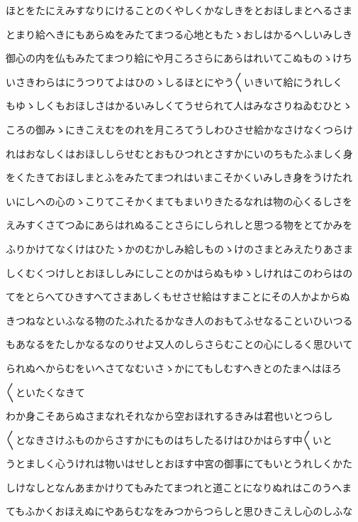 \documentclass[a4paper,11pt,landscape]{ltjtarticle}
\begin{document}
\par\medskip
ほとをたにえみすなりにけることのくやしくかなしきをとおほしまとへるさま
\par\medskip
とまり給へきにもあらぬをみたてまつる心地ともたゝおしはかるへしいみしき
\par\medskip
御心の内を仏もみたてまつり給にや月ころさらにあらはれいてこぬものゝけち
\par\medskip
いさきわらはにうつりてよはひのゝしるほとにやう〱いきいて給にうれしく
\par\medskip
もゆゝしくもおほしさはかるいみしくてうせられて人はみなさりねゐむひとゝ
\par\medskip
ころの御みゝにきこえむをのれを月ころてうしわひさせ給かなさけなくつらけ
\par\medskip
れはおなしくはおほししらせむとおもひつれとさすかにいのちもたふましく身
\par\medskip
をくたきておほしまとふをみたてまつれはいまこそかくいみしき身をうけたれ
\par\medskip
いにしへの心のゝこりてこそかくまてもまいりきたるなれは物の心くるしさを
\par\medskip
えみすくさてつゐにあらはれぬることさらにしられしと思つる物をとてかみを
\par\medskip
ふりかけてなくけはひたゝかのむかしみ給しものゝけのさまとみえたりあさま
\par\medskip
しくむくつけしとおほししみにしことのかはらぬもゆゝしけれはこのわらはの
\par\medskip
てをとらへてひきすへてさまあしくもせさせ給はすまことにその人かよからぬ
\par\medskip
きつねなといふなる物のたふれたるかなき人のおもてふせなることいひいつる
\par\medskip
もあなるをたしかなるなのりせよ又人のしらさらむことの心にしるく思ひいて
\par\medskip
られぬへからむをいへさてなむいさゝかにてもしむすへきとのたまへはほろ
\par\medskip
〱といたくなきて
\par\medskip
わか身こそあらぬさまなれそれなから空おほれするきみは君也いとつらし
\par\medskip
〱となきさけふものからさすかにものはちしたるけはひかはらす中〱いと
\par\medskip
うとましく心うけれは物いはせしとおほす中宮の御事にてもいとうれしくかた
\par\medskip
しけなしとなんあまかけりてもみたてまつれと道ことになりぬれはこのうへま
\par\medskip
てもふかくおほえぬにやあらむなをみつからつらしと思ひきこえし心のしふな
\end{document}
